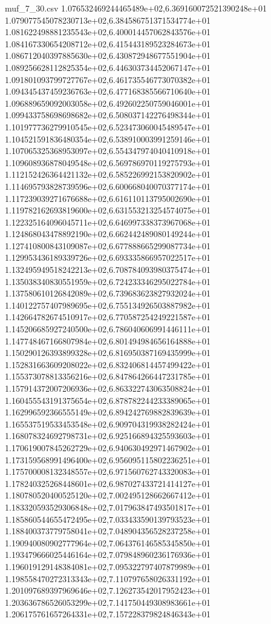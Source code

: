 \begin{filecontents*}{muf_7_30.csv}
1.076532469244465489e+02,6.369160072521390248e+01
1.079077545078230713e+02,6.384586751371534774e+01
1.081622498881235543e+02,6.400014457062843576e+01
1.084167330654208712e+02,6.415443189523284673e+01
1.086712040397885630e+02,6.430872948677551904e+01
1.089256628112825354e+02,6.446303734452067147e+01
1.091801093799727767e+02,6.461735546773070382e+01
1.094345437459236763e+02,6.477168385566710640e+01
1.096889659092003058e+02,6.492602250759046001e+01
1.099433758698698682e+02,6.508037142276498344e+01
1.101977736279910545e+02,6.523473060045489547e+01
1.104521591836480354e+02,6.538910003991259146e+01
1.107065325368953097e+02,6.554347974040410918e+01
1.109608936878049548e+02,6.569786970119275793e+01
1.112152426364421132e+02,6.585226992153820902e+01
1.114695793828739596e+02,6.600668040070377174e+01
1.117239039271676688e+02,6.616110113795002690e+01
1.119782162693819600e+02,6.631553213254574075e+01
1.122325164096045711e+02,6.646997338373967068e+01
1.124868043478892190e+02,6.662442489080149244e+01
1.127410800843109087e+02,6.677888665299087734e+01
1.129953436189339726e+02,6.693335866957022517e+01
1.132495949518242213e+02,6.708784093980375474e+01
1.135038340830551959e+02,6.724233346295022784e+01
1.137580610126842089e+02,6.739683623827932024e+01
1.140122757407989695e+02,6.755134926503887982e+01
1.142664782674510917e+02,6.770587254249221587e+01
1.145206685927240500e+02,6.786040606991446111e+01
1.147748467166807984e+02,6.801494984656164888e+01
1.150290126393899328e+02,6.816950387169435999e+01
1.152831663609208022e+02,6.832406814457499422e+01
1.155373078813356216e+02,6.847864266447231785e+01
1.157914372007206936e+02,6.863322743063508824e+01
1.160455543191375654e+02,6.878782244233389065e+01
1.162996592366555149e+02,6.894242769882839639e+01
1.165537519533453548e+02,6.909704319938282424e+01
1.168078324692798731e+02,6.925166894325593603e+01
1.170619007845262729e+02,6.940630492971467902e+01
1.173159568991496400e+02,6.956095115802236251e+01
1.175700008132348557e+02,6.971560762743320083e+01
1.178240325268448601e+02,6.987027433721414127e+01
1.180780520400525120e+02,7.002495128662667412e+01
1.183320593529306848e+02,7.017963847493501817e+01
1.185860544655472495e+02,7.033433590139793523e+01
1.188400373779758041e+02,7.048904356528237258e+01
1.190940080902777964e+02,7.064376146585345850e+01
1.193479666025446164e+02,7.079848960236176936e+01
1.196019129148384081e+02,7.095322797407879989e+01
1.198558470272313343e+02,7.110797658026331192e+01
1.201097689397969646e+02,7.126273542017952423e+01
1.203636786526053299e+02,7.141750449308983661e+01
1.206175761657264331e+02,7.157228379824846343e+01

\end{filecontents*}
